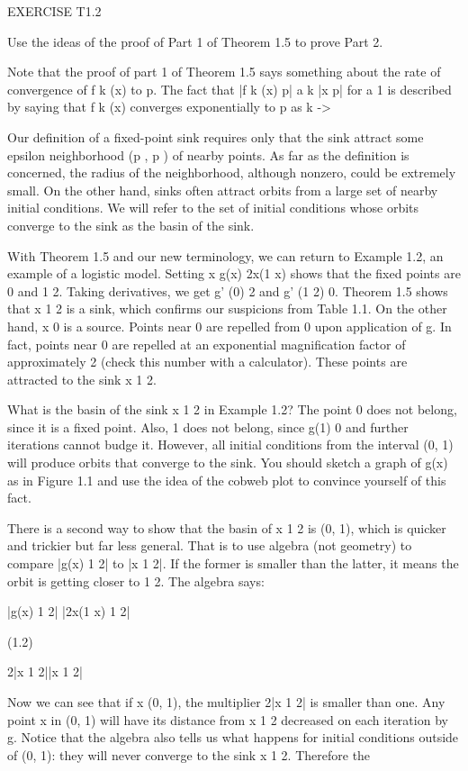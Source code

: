 \documentclass[12pt]{article}
\begin{document}
EXERCISE T1.2

Use the ideas of the proof of Part 1 of Theorem 1.5 to prove Part 2.

Note that the proof of part 1 of Theorem 1.5 says something about the rate of convergence of f k (x) to p. 
The fact that |f k (x)  p| a k |x  p| for a  1 is described by saying that f k (x) converges exponentially 
to p as k -> 


Our definition of a fixed-point sink requires only that the sink attract some epsilon neighborhood (p  , p  
) of nearby points. As far as the definition is concerned, the radius  of the neighborhood, although 
nonzero, could be extremely small. On the other hand, sinks often attract orbits from a large set of nearby 
initial conditions. We will refer to the set of initial conditions whose orbits converge to the sink as the 
basin of the sink.

With Theorem 1.5 and our new terminology, we can return to Example 1.2, an example of a logistic model. 
Setting x  g(x)  2x(1  x) shows that the fixed points are 0 and 1  2. Taking derivatives, we get g' (0)  2 
and g' (1  2)  0. Theorem 1.5 shows that x  1  2 is a sink, which confirms our suspicions from Table 1.1. 
On the other hand, x  0 is a source. Points near 0 are repelled from 0 upon application of g. In fact, 
points near 0 are repelled at an exponential magnification factor of approximately 2 (check this number 
with a calculator). These points are attracted to the sink x  1  2.

What is the basin of the sink x  1  2 in Example 1.2? The point 0 does not belong, since it is a fixed 
point. Also, 1 does not belong, since g(1)  0 and further iterations cannot budge it. However, all initial 
conditions from the interval (0, 1) will produce orbits that converge to the sink. You should sketch a 
graph of g(x) as in Figure 1.1 and use the idea of the cobweb plot to convince yourself of this fact.

There is a second way to show that the basin of x  1  2 is (0, 1), which is quicker and trickier but far 
less general. That is to use algebra (not geometry) to compare |g(x)  1  2| to |x  1  2|. If the former is 
smaller than the latter, it means the orbit is getting closer to 1  2. The algebra says:

|g(x)  1  2|  |2x(1  x)  1  2|

(1.2)

 2|x  1  2||x  1  2|

Now we can see that if x  (0, 1), the multiplier 2|x  1  2| is smaller than one. Any point x in (0, 1) will 
have its distance from x  1  2 decreased on each iteration by g. Notice that the algebra also tells us what 
happens for initial conditions outside of (0, 1): they will never converge to the sink x  1  2. Therefore 
the
\end{document}
